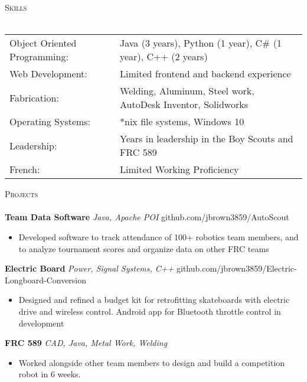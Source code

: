 \documentclass[a4paper]{article}
\newcommand{\lineunder} {
    \vspace*{-8pt} \\
    \hspace*{-18pt} \hrulefill \\
}
\newcommand{\header} [1] {
    {\hspace*{-18pt}\vspace*{6pt} \textsc{#1}}
    \vspace*{-6pt} \lineunder
}
\begin{document}
\header{Skills}
\begin{tabular}{ l l }
	Object Oriented Programming: & Java (3 years), Python (1 year), C\# (1 year), C++ (2 years) \\
	Web Development:             & Limited frontend and backend experience                      \\
	Fabrication:                 & Welding, Aluminum, Steel work, AutoDesk Inventor, Solidworks \\
	Operating Systems:           & *nix file systems, Windows 10                                \\
	Leadership:                  & Years in leadership in the Boy Scouts and FRC 589            \\
	French:                      & Limited Working Proficiency                                  \\
\end{tabular}
\vspace{2mm}

\header{Projects}
{\textbf{Team Data Software}} {\sl Java, Apache POI} \hfill github.com/jbrown3859/AutoScout\\
\begin{itemize} \itemsep 1pt
	\item Developed software to track attendance of 100+ robotics team members, and to analyze tournament scores and organize data on other FRC teams\\
\end{itemize}
\vspace*{2mm}
{\textbf{Electric Board}} {\sl Power, Signal Systems, C++} \hfill github.com/jbrown3859/Electric-Longboard-Conversion\\
\begin{itemize} \itemsep 1pt
	\item Designed and refined a budget kit for retrofitting skateboards with electric drive and wireless control. Android app for Bluetooth throttle control in development\\
\end{itemize}
\vspace*{2mm}
{\textbf{FRC 589}} {\sl CAD, Java, Metal Work, Welding} \\
\begin{itemize} \itemsep 1pt
	\item Worked alongside other team members to design and build a competition robot in 6 weeks.\\
\end{itemize}
\vspace*{2mm}
\end{document}
